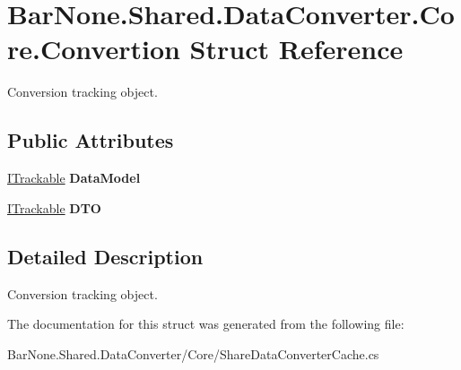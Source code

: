 \hypertarget{struct_bar_none_1_1_shared_1_1_data_converter_1_1_core_1_1_convertion}{}\section{Bar\+None.\+Shared.\+Data\+Converter.\+Core.\+Convertion Struct Reference}
\label{struct_bar_none_1_1_shared_1_1_data_converter_1_1_core_1_1_convertion}


Conversion tracking object.  


\subsection*{Public Attributes}
\begin{DoxyCompactItemize}
\item 
\mbox{\label{struct_bar_none_1_1_shared_1_1_data_converter_1_1_core_1_1_convertion_a67abfbf8e387d987e9a640d7ad1f5688}} 
\mbox{\hyperlink{interface_bar_none_1_1_shared_1_1_core_1_1_i_trackable}{I\+Trackable}} {\bfseries Data\+Model}
\item 
\mbox{\label{struct_bar_none_1_1_shared_1_1_data_converter_1_1_core_1_1_convertion_aa75ee31db4d53964128dca794a7d5238}} 
\mbox{\hyperlink{interface_bar_none_1_1_shared_1_1_core_1_1_i_trackable}{I\+Trackable}} {\bfseries D\+TO}
\end{DoxyCompactItemize}


\subsection{Detailed Description}
Conversion tracking object. 



The documentation for this struct was generated from the following file\+:\begin{DoxyCompactItemize}
\item 
Bar\+None.\+Shared.\+Data\+Converter/\+Core/Share\+Data\+Converter\+Cache.\+cs\end{DoxyCompactItemize}
